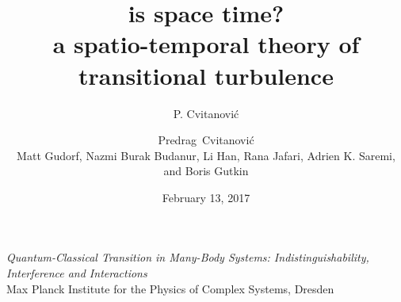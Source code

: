 


\usepackage[font=scriptsize, labelfont=bf]{caption}
\usepackage[
    backend=biber,  %
    sorting=nyt,
    style=numeric, %
    natbib=true,
    style=phys, %
    biblabel= brackets, %
    articletitle=false, %
    pageranges = true , %
    sortlocale=en_US,
    firstinits=true,
    url=false, %
    doi=false, %
    eprint=false
]{biblatex}



\renewcommand{\Ssym}[1]{{\ensuremath{m_{#1}}}}    %




\title{
{\huge is space time?}
    \\
{a spatio-temporal theory of transitional turbulence}
}
\author{P. Cvitanovi\'c}
\author[Cvitanovi\'c]
{
  \textcolor{green!50!black}{
  {Predrag~Cvitanovi\'c \\
  Matt Gudorf,
  Nazmi Burak Budanur,
        Li Han,
        Rana Jafari,
		Adrien K. Saremi,
  and
  Boris Gutkin
  }	%
  }
}
\institute
{
{\em Quantum-Classical Transition in Many-Body Systems:
Indistinguishability, Interference and Interactions}
\\
 Max Planck Institute for the Physics of Complex Systems, Dresden
 }
\date{February 13, 2017}

\begin{frame}
  \titlepage
\end{frame}



